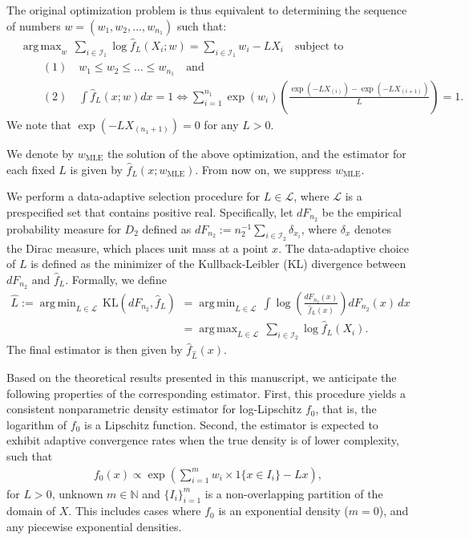 \documentclass[12pt]{article}
\DeclareMathOperator*{\argmin}{arg\,min}
\DeclareMathOperator*{\argmax}{arg\,max}
\begin{document}
\begin{appendices}
The original optimization problem is thus equivalent to determining the sequence of numbers $w = (w_1, w_2,  \ldots,  w_{n_1})$ such that:
\begin{align}
	&\argmax_{w}\, \sum_{i \in \mathcal{I}_1} \log \widehat f_L(X_i; w) = \sum_{i \in \mathcal{I}_1} w_i- LX_i \nonumber \quad  \text{subject to} \\
 &\qquad (1) \quad w_1 \le w_2  \le  \ldots  \le  w_{n_1} \quad \text{and} \nonumber\\
 &\qquad (2) \quad \int \widehat{f}_L(x ; w) d x=1 \Longleftrightarrow \sum_{i=1}^{n_1} \exp \left(w_i\right)\left(\frac{\exp \left(-L X_{(i)}\right)-\exp \left(-L X_{(i+1)}\right)}{L}\right)=1.\nonumber
\end{align}
We note that $\exp(-LX_{(n_1+1)})=0$ for any $L > 0$. 

We denote by $w_{\textrm{MLE}}$ the solution of the above optimization, and the estimator for each fixed $L$ is given by $\widehat f_L(x; w_{\textrm{MLE}})$. From now on, we suppress $w_{\textrm{MLE}}$. 

We perform a data-adaptive selection procedure for $L \in \mathcal{L}$, where  $\mathcal{L}$ is a prespecified set that contains positive real. Specifically, let $d F_{n_2}$ be the empirical probability measure for $D_2$ defined as $dF_{n_2} := n_2^{-1}\sum_{i\in \mathcal{I}_2}\delta_{x_i}$, where $\delta_x$ denotes the Dirac measure, which places unit mass at a point $x$. The data-adaptive choice of $L$ is defined as the minimizer of the Kullback-Leibler (KL) divergence between $dF_{n_2}$ and $\widehat f_{L}$. Formally, we define
\begin{align}
	\widehat L := \argmin_{L \in \mathcal{L}}\, \mathrm{KL}(dF_{n_2}, \widehat f_{L}) &= \argmin_{L \in \mathcal{L}}\, \int  \log \left(\frac{dF_{n_2}(x)}{\widehat f_{L}(x)}\right)dF_{n_2}(x)\, dx\nonumber\\
 &=\argmax_{L\in\mathcal{L}}\, \sum_{i \in \mathcal{I}_2} \log \widehat f_L(X_i). \nonumber
	\end{align} 
The final estimator is then given by $\widehat f_{\widehat L}(x)$.
	
Based on the theoretical results presented in this manuscript, we anticipate the following properties of the corresponding estimator. First, this procedure yields a consistent nonparametric density estimator for log-Lipschitz $f_0$, that is, the logarithm of $f_0$ is a Lipschitz function. Second, the estimator is expected to exhibit adaptive convergence rates when the true density is of lower complexity, such that 
\begin{align}
	f_0(x) \propto \exp\left(\sum_{i=1}^m w_i\times 1\{x \in I_i\} - Lx \right)\nonumber,
\end{align}
for $L > 0$, unknown $m \in \mathbb{N}$ and $\{I_i\}_{i=1}^m$ is a non-overlapping partition of the domain of $X$. This includes cases where $f_0$ is an exponential density ($m=0$), and any piecewise exponential densities. 


\end{appendices}
\end{document}
